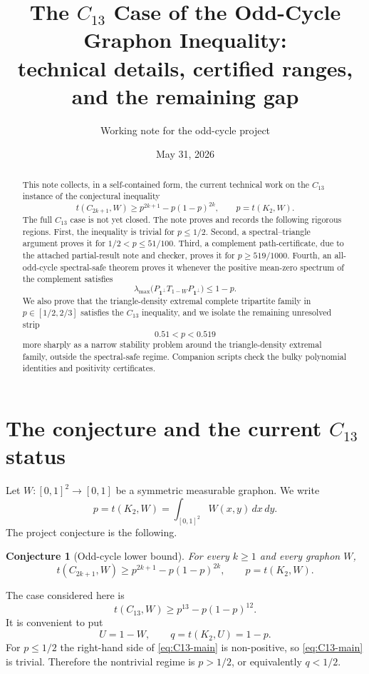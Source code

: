 \documentclass[11pt]{article}
\title{The $C_{13}$ Case of the Odd-Cycle Graphon Inequality:\\
\large technical details, certified ranges, and the remaining gap}
\author{Working note for the odd-cycle project}
\date{May 31, 2026}
\newtheorem{conjecture}[theorem]{Conjecture}
\newcommand{\one}{\mathbf 1}
\begin{document}
\maketitle

\begin{abstract}
This note collects, in a self-contained form, the current technical work on the
$C_{13}$ instance of the conjectural inequality
\[
        t(C_{2k+1},W)\ge p^{2k+1}-p(1-p)^{2k},\qquad p=t(K_2,W).
\]
The full $C_{13}$ case is not yet closed.  The note proves and records the
following rigorous regions.  First, the inequality is trivial for $p\le 1/2$.
Second, a spectral--triangle argument proves it for
$1/2<p\le 51/100$.  Third, a complement path-certificate, due to the attached
partial-result note and checker, proves it for $p\ge 519/1000$.  Fourth, an
all-odd-cycle spectral-safe theorem proves it whenever the positive mean-zero
spectrum of the complement satisfies
\[
        \lambda_{\max}\bigl(P_{\one^\perp}T_{1-W}P_{\one^\perp}\bigr)\le 1-p.
\]
We also prove that the triangle-density extremal complete tripartite family in
$p\in[1/2,2/3]$ satisfies the $C_{13}$ inequality, and we isolate the remaining
unresolved strip
\[
        0.51<p<0.519
\]
more sharply as a narrow stability problem around the triangle-density extremal
family, outside the spectral-safe regime.  Companion scripts check the bulky
polynomial identities and positivity certificates.
\end{abstract}

\tableofcontents

\section{The conjecture and the current $C_{13}$ status}

Let $W:[0,1]^2\to[0,1]$ be a symmetric measurable graphon.  We write
\[
        p=t(K_2,W)=\int_{[0,1]^2} W(x,y)\,dx\,dy.
\]
The project conjecture is the following.

\begin{conjecture}[Odd-cycle lower bound]\label{conj:odd-cycle}
For every $k\ge1$ and every graphon $W$,
\[
        t(C_{2k+1},W)\ge p^{2k+1}-p(1-p)^{2k},
        \qquad p=t(K_2,W).
\]
\end{conjecture}

The case considered here is
\begin{equation}\label{eq:C13-main}
        t(C_{13},W)\ge p^{13}-p(1-p)^{12}.
\end{equation}
It is convenient to put
\[
        U=1-W,\qquad q=t(K_2,U)=1-p.
\]
For $p\le1/2$ the right-hand side of \eqref{eq:C13-main} is non-positive, so
\eqref{eq:C13-main} is trivial.  Therefore the nontrivial regime is $p>1/2$, or
equivalently $q<1/2$.
\end{document}

